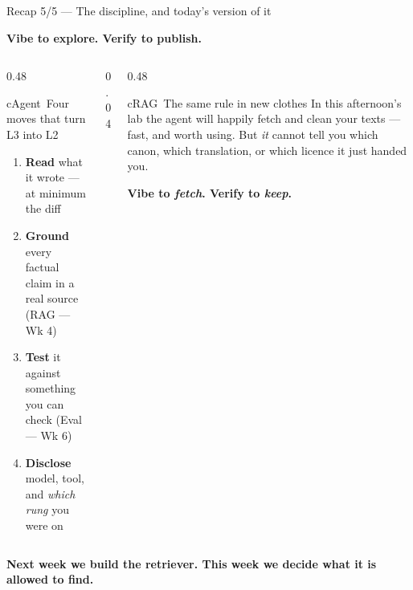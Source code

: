 \begin{frame}{Recap 5/5 --- The discipline, and today's version of it}
  \begin{center}
    \begin{tcolorbox}[enhanced, width=0.82\textwidth, colback=labnavy!7, colframe=labnavy,
                      boxrule=0.9pt, arc=3pt, drop fuzzy shadow, halign=center,
                      top=5pt, bottom=5pt]
      {\large\bfseries\color{labnavy} Vibe to explore. Verify to publish.}
    \end{tcolorbox}
  \end{center}
  \vspace{2pt}
  \begin{columns}[t, totalwidth=\textwidth]
    \begin{column}{0.48\textwidth}
      \begin{featbox}{cAgent}{\faListOl\ Four moves that turn L3 into L2}
        \scriptsize
        \begin{enumerate}
          \item \textbf{Read} what it wrote --- at minimum the diff
          \item \textbf{Ground} every factual claim in a real source {\color{cRAG}(RAG --- Wk 4)}
          \item \textbf{Test} it against something you can check {\color{cEval}(Eval --- Wk 6)}
          \item \textbf{Disclose} model, tool, and \emph{which rung} you were on
        \end{enumerate}
      \end{featbox}
    \end{column}
    \begin{column}{0.04\textwidth}\end{column}
    \begin{column}{0.48\textwidth}
      \begin{featbox}{cRAG}{\faScroll\ The same rule in new clothes}
        \scriptsize
        In this afternoon's lab the agent will happily fetch and clean your texts ---
        fast, and worth using. But \emph{it} cannot tell you which canon, which
        translation, or which licence it just handed you.
        \vspace{3pt}
        \begin{center}\normalsize\bfseries\color{labnavy}
          Vibe to \emph{fetch}. Verify to \emph{keep}.\end{center}
      \end{featbox}
    \end{column}
  \end{columns}
  \vspace{6pt}
  \begin{center}\small\color{labnavy}\bfseries
    Next week we build the retriever. This week we decide what it is allowed to find.\end{center}
\end{frame}

